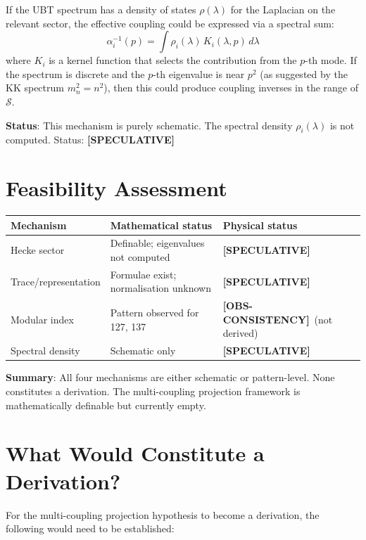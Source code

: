\documentclass[12pt,a4paper]{article}
\theoremstyle{definition}
\theoremstyle{remark}
\newcommand{\obs}{\textcolor{blue!45!black}{\textbf{[OBS-CONSISTENCY]}}}
\newcommand{\spec}{\textcolor{purple!60!black}{\textbf{[SPECULATIVE]}}}
\begin{document}
If the UBT spectrum has a density of states $\rho(\lambda)$ for the Laplacian
on the relevant sector, the effective coupling could be expressed via a spectral
sum:
\begin{equation}
  \alpha_i^{-1}(p) = \int \rho_i(\lambda)\, K_i(\lambda, p)\, d\lambda
\end{equation}
where $K_i$ is a kernel function that selects the contribution from the
$p$-th mode.  If the spectrum is discrete and the $p$-th eigenvalue is near $p^2$
(as suggested by the KK spectrum $m_n^2 = n^2$), then this could produce coupling
inverses in the range of $\mathcal{S}$.

\textbf{Status}: This mechanism is purely schematic.  The spectral density
$\rho_i(\lambda)$ is not computed.  Status: \spec

\section{Feasibility Assessment}

\begin{center}
\begin{tabular}{lll}
\toprule
Mechanism & Mathematical status & Physical status \\
\midrule
Hecke sector & Definable; eigenvalues not computed & \spec \\
Trace/representation & Formulae exist; normalisation unknown & \spec \\
Modular index & Pattern observed for 127, 137 & \obs\ (not derived) \\
Spectral density & Schematic only & \spec \\
\bottomrule
\end{tabular}
\end{center}

\textbf{Summary}: All four mechanisms are either schematic or pattern-level.
None constitutes a derivation.  The multi-coupling projection framework is
mathematically definable but currently empty.

\section{What Would Constitute a Derivation?}

For the multi-coupling projection hypothesis to become a derivation, the
following would need to be established:
\end{document}
